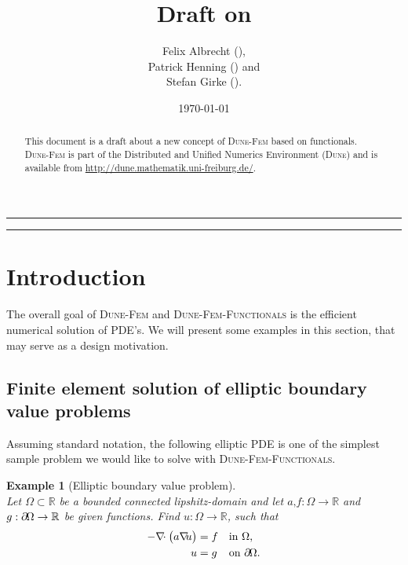 \documentclass[a4paper,11pt]{article}
\title{Draft on \dunefemfunctionals}
\author{Felix Albrecht (\Code{felix.albrecht@uni-muenster.de}),\\
  Patrick Henning (\Code{patrick.henning@uni-muenster.de}) and\\
	Stefan Girke (\Code{s\_girk01@uni-muenster.de}).
}
\date{\today}
\numberwithin{equation}{section}
\newtheorem{example}[definition]{Example}
\newcommand{\theoremNewline}{\hspace{1mm}\\}
\newcommand{\theoremEndLine}{\hspace{1mm}}
\newcommand{\dune}{\textsc{Dune}\xspace}
\newcommand{\dunefem}{\textsc{Dune-Fem}\xspace}
\newcommand{\dunefemfunctionals}{\textsc{Dune-Fem-Functionals}\xspace}
\newcommand{\hnS}{\hspace{-1.25pt}}
\newcommand{\divergence}{\nabla\hnS\hnS\hnS\cdot}
\newcommand{\gradient}{\nabla\hnS\hnS}
\newcommand{\boundary}{\partial \hnS}
\newcommand{\komma}{\text{,}}
\newcommand{\punkt}{\text{.}}
\newcommand{\R}{\mathbb{R}}
\begin{document}
  \maketitle

  \begin{abstract}
    This document is a draft about a new concept of \dunefem based on functionals. \dunefem is part of the
    Distributed and Unified Numerics Environment (\dune) and is available from
    \url{http://dune.mathematik.uni-freiburg.de/}.
  \end{abstract}

  \hrule

  \begin{small}
    \tableofcontents
  \end{small}

  \vspace{5mm}
  \hrule

  \section{Introduction}
    \label{section::introduction}

    The overall goal of \dunefem and \dunefemfunctionals is the efficient numerical solution of PDE's. We will present
    some examples in this section, that may serve as a design motivation.

    \subsection{Finite element solution of elliptic boundary value problems}

    Assuming standard notation, the following elliptic PDE is one of the simplest sample problem we would like to solve
    with \dunefemfunctionals.

    \begin{example}[Elliptic boundary value problem]\theoremNewline
      \label{example::introduction::elliptic_pde}
      Let ${\Omega \subset \R}$ be a bounded connected lipshitz-domain and let ${a\komma f : \Omega \rightarrow \R}$ and
      ${g : \boundary\Omega \rightarrow \R}$ be given functions. Find ${u: \Omega \rightarrow \R}$, such that
      \begin{align}
        \label{equation::introduction::elliptic_pde}
        - \divergence
          \big(
            a \gradient u
          \big)
          &= f &&\text{in } \Omega \komma
        \\
        u &= g &&\text{on } \boundary\Omega \punkt
        \notag
      \end{align}
    \end{example}\theoremEndLine
\end{document}
